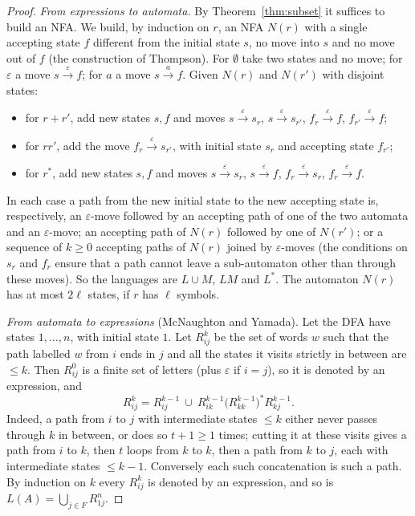 \begin{proof}
\emph{From expressions to automata.} By Theorem~\ref{thm:subset} it suffices to build an NFA. We build, by induction on $r$, an NFA $N(r)$ with a single accepting state $f$ different from the initial state $s$, no move into $s$ and no move out of $f$ (the construction of Thompson). For $\emptyset$ take two states and no move; for $\varepsilon$ a move $s\xrightarrow{\varepsilon}f$; for $a$ a move $s\xrightarrow{a}f$. Given $N(r)$ and $N(r')$ with disjoint states:
\begin{itemize}
\item for $r+r'$, add new states $s,f$ and moves $s\xrightarrow{\varepsilon}s_r$, $s\xrightarrow{\varepsilon}s_{r'}$, $f_r\xrightarrow{\varepsilon}f$, $f_{r'}\xrightarrow{\varepsilon}f$;
\item for $rr'$, add the move $f_r\xrightarrow{\varepsilon}s_{r'}$, with initial state $s_r$ and accepting state $f_{r'}$;
\item for $r^*$, add new states $s,f$ and moves $s\xrightarrow{\varepsilon}s_r$, $s\xrightarrow{\varepsilon}f$, $f_r\xrightarrow{\varepsilon}s_r$, $f_r\xrightarrow{\varepsilon}f$.
\end{itemize}
In each case a path from the new initial state to the new accepting state is, respectively, an $\varepsilon$-move followed by an accepting path of one of the two automata and an $\varepsilon$-move; an accepting path of $N(r)$ followed by one of $N(r')$; or a sequence of $k\ge0$ accepting paths of $N(r)$ joined by $\varepsilon$-moves (the conditions on $s_r$ and $f_r$ ensure that a path cannot leave a sub-automaton other than through these moves). So the languages are $L\cup M$, $LM$ and $L^*$. The automaton $N(r)$ has at most $2\ell$ states, if $r$ has $\ell$ symbols.

\emph{From automata to expressions} (McNaughton and Yamada). Let the DFA have states $1,\dots,n$, with initial state $1$. Let $R^k_{ij}$ be the set of words $w$ such that the path labelled $w$ from $i$ ends in $j$ and all the states it visits strictly in between are $\le k$. Then $R^0_{ij}$ is a finite set of letters (plus $\varepsilon$ if $i=j$), so it is denoted by an expression, and
\[
R^k_{ij}=R^{k-1}_{ij}\ \cup\ R^{k-1}_{ik}\bigl(R^{k-1}_{kk}\bigr)^*R^{k-1}_{kj}.
\]
Indeed, a path from $i$ to $j$ with intermediate states $\le k$ either never passes through $k$ in between, or does so $t+1\ge1$ times; cutting it at these visits gives a path from $i$ to $k$, then $t$ loops from $k$ to $k$, then a path from $k$ to $j$, each with intermediate states $\le k-1$. Conversely each such concatenation is such a path. By induction on $k$ every $R^k_{ij}$ is denoted by an expression, and so is $L(A)=\bigcup_{j\in F}R^n_{1j}$.
\end{proof}

